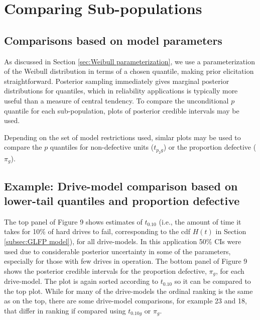 \documentclass[11pt]{article}
\begin{document}
\section{Comparing Sub-populations}
\subsection{Comparisons based on model parameters}
As discussed in Section \ref{sec:Weibull parameterization}, we use a parameterization of the Weibull distribution in terms of a chosen quantile, making prior elicitation straightforward. Posterior sampling immediately gives marginal posterior distributions for quantiles, which in reliability applications is typically more useful than a measure of central tendency. To compare the unconditional $p$ quantile for each sub-population, plots of posterior credible intervals may be used.

Depending on the set of model restrictions used, simlar plots may be used to compare the $p$ quantiles for non-defective units ($t_{p_{2}g}$) or the proportion defective ($\pi_g$).

\subsection{Example: Drive-model comparison based on lower-tail quantiles and proportion defective}
The top panel of Figure 9 shows estimates of $t_{0.10}$ (i.e., the amount of time it takes for 10\% of hard drives to fail, corresponding to the cdf $H(t)$ in Section \ref{subsec:GLFP model}), for all drive-models.  In this application 50\% CIs were used due to considerable posterior uncertainty in some of the parameters, especially for those with few drives in operation.  %
The bottom panel of Figure 9 shows the posterior credible intervals for the proportion defective, $\pi_g$, for each drive-model.  The plot is again sorted according to $t_{0.10}$ so it can be compared to the top plot.  While for many of the drive-models the ordinal ranking is the same as on the top, there are some drive-model comparisons, for example 23 and 18, that differ in ranking if compared using $t_{0.10g}$ or $\pi_g$.
\end{document}
